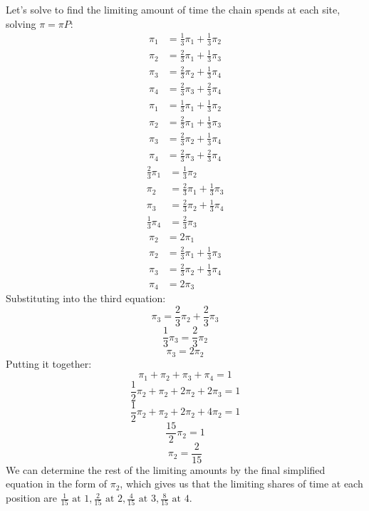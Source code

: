 \documentclass{article}
\begin{document}
{Let's solve to find the limiting amount of time the chain spends at each site, solving \(\pi = \pi P\):
\begin{align*}
  \pi_1 &= \frac{1}{3}\pi_1 + \frac{1}{3}\pi_2 \\
  \pi_2 &= \frac{2}{3}\pi_1 + \frac{1}{3}\pi_3 \\
  \pi_3 &= \frac{2}{3}\pi_2 + \frac{1}{3}\pi_4 \\
  \pi_4 &= \frac{2}{3}\pi_3 + \frac{2}{3}\pi_4
\end{align*}
\begin{align*}
  \pi_1 &= \frac{1}{3}\pi_1 + \frac{1}{3}\pi_2 \\
  \pi_2 &= \frac{2}{3}\pi_1 + \frac{1}{3}\pi_3 \\
  \pi_3 &= \frac{2}{3}\pi_2 + \frac{1}{3}\pi_4 \\
  \pi_4 &= \frac{2}{3}\pi_3 + \frac{2}{3}\pi_4
\end{align*}
\begin{align*}
  \frac{2}{3}\pi_1 &= \frac{1}{3}\pi_2 \\
  \pi_2 &= \frac{2}{3}\pi_1 + \frac{1}{3}\pi_3 \\
  \pi_3 &= \frac{2}{3}\pi_2 + \frac{1}{3}\pi_4 \\
  \frac{1}{3}\pi_4 &= \frac{2}{3}\pi_3
\end{align*}
\begin{align*}
  \pi_2 &= 2\pi_1 \\
  \pi_2 &= \frac{2}{3}\pi_1 + \frac{1}{3}\pi_3 \\
  \pi_3 &= \frac{2}{3}\pi_2 + \frac{1}{3}\pi_4 \\
  \pi_4 &= 2\pi_3
\end{align*}
Substituting into the third equation:
\[
  \pi_3 = \frac{2}{3}\pi_2 + \frac{2}{3}\pi_3
\]
\[
  \frac{1}{3}\pi_3 = \frac{2}{3}\pi_2
\]
\[
  \pi_3 = 2\pi_2
\]
Putting it together:
\[
  \pi_1 + \pi_2 + \pi_3 + \pi_4 = 1
\]
\[
  \frac{1}{2}\pi_2 + \pi_2 + 2\pi_2 + 2\pi_3 = 1
\]
\[
  \frac{1}{2}\pi_2 + \pi_2 + 2\pi_2 + 4\pi_2 = 1
\]
\[
  \frac{15}{2}\pi_2 = 1
\]
\[
  \pi_2 = \frac{2}{15}
\]
We can determine the rest of the limiting amounts by the final simplified equation in the form of \(\pi_2\), which gives us that the limiting shares of time at each position are \(\boxed{\frac{1}{15} \text{ at } 1, \frac{2}{15} \text{ at } 2, \frac{4}{15} \text{ at } 3, \frac{8}{15} \text{ at } 4}\).


}
\end{document}
